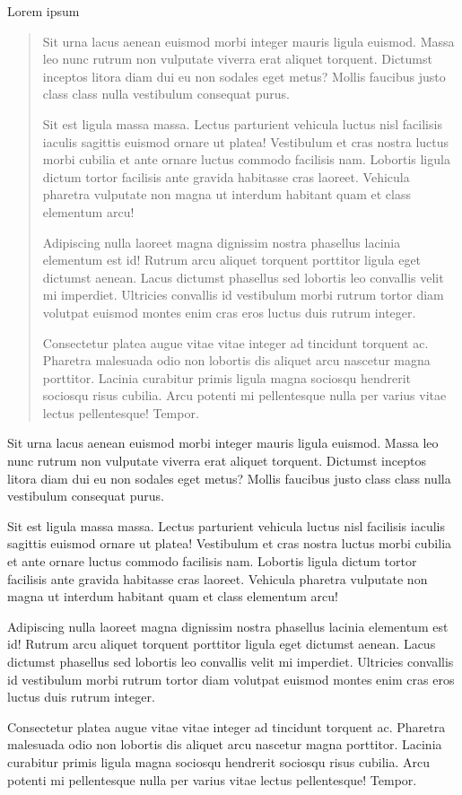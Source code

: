 \documentclass[aprovado,numbers]{coppe}
\begin{document}
  Lorem ipsum
  \begin{abstract}
Sit urna lacus aenean euismod morbi integer mauris ligula euismod. Massa leo nunc rutrum non vulputate viverra erat aliquet torquent. Dictumst inceptos litora diam dui eu non sodales eget metus? Mollis faucibus justo class class nulla vestibulum consequat purus.

Sit est ligula massa massa. Lectus parturient vehicula luctus nisl facilisis iaculis sagittis euismod ornare ut platea! Vestibulum et cras nostra luctus morbi cubilia et ante ornare luctus commodo facilisis nam. Lobortis ligula dictum tortor facilisis ante gravida habitasse cras laoreet. Vehicula pharetra vulputate non magna ut interdum habitant quam et class elementum arcu!

Adipiscing nulla laoreet magna dignissim nostra phasellus lacinia elementum est id! Rutrum arcu aliquet torquent porttitor ligula eget dictumst aenean. Lacus dictumst phasellus sed lobortis leo convallis velit mi imperdiet. Ultricies convallis id vestibulum morbi rutrum tortor diam volutpat euismod montes enim cras eros luctus duis rutrum integer.

Consectetur platea augue vitae vitae integer ad tincidunt torquent ac. Pharetra malesuada odio non lobortis dis aliquet arcu nascetur magna porttitor. Lacinia curabitur primis ligula magna sociosqu hendrerit sociosqu risus cubilia. Arcu potenti mi pellentesque nulla per varius vitae lectus pellentesque! Tempor.
  \end{abstract}
  \begin{foreignabstract}
Sit urna lacus aenean euismod morbi integer mauris ligula euismod. Massa leo nunc rutrum non vulputate viverra erat aliquet torquent. Dictumst inceptos litora diam dui eu non sodales eget metus? Mollis faucibus justo class class nulla vestibulum consequat purus.

Sit est ligula massa massa. Lectus parturient vehicula luctus nisl facilisis iaculis sagittis euismod ornare ut platea! Vestibulum et cras nostra luctus morbi cubilia et ante ornare luctus commodo facilisis nam. Lobortis ligula dictum tortor facilisis ante gravida habitasse cras laoreet. Vehicula pharetra vulputate non magna ut interdum habitant quam et class elementum arcu!

Adipiscing nulla laoreet magna dignissim nostra phasellus lacinia elementum est id! Rutrum arcu aliquet torquent porttitor ligula eget dictumst aenean. Lacus dictumst phasellus sed lobortis leo convallis velit mi imperdiet. Ultricies convallis id vestibulum morbi rutrum tortor diam volutpat euismod montes enim cras eros luctus duis rutrum integer.

Consectetur platea augue vitae vitae integer ad tincidunt torquent ac. Pharetra malesuada odio non lobortis dis aliquet arcu nascetur magna porttitor. Lacinia curabitur primis ligula magna sociosqu hendrerit sociosqu risus cubilia. Arcu potenti mi pellentesque nulla per varius vitae lectus pellentesque! Tempor.
  \end{foreignabstract}
  \tableofcontents
\end{document}
